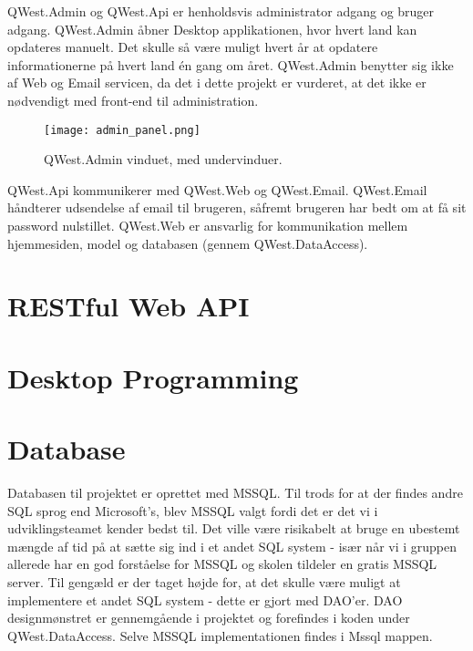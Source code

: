 QWest.Admin og QWest.Api er henholdsvis administrator adgang og bruger adgang. QWest.Admin åbner Desktop applikationen, hvor hvert land kan opdateres manuelt. Det skulle så være muligt hvert år at opdatere informationerne på hvert land én gang om året. QWest.Admin benytter sig ikke af Web og Email servicen, da det i dette projekt er vurderet, at det ikke er nødvendigt med front-end til administration. 

\begin{figure}
    \texttt{[image: admin\_panel.png]}
    \caption{QWest.Admin vinduet, med undervinduer.}
    \label{fig:admin_panel}
\end{figure}

QWest.Api kommunikerer med QWest.Web og QWest.Email. QWest.Email håndterer udsendelse af email til brugeren, såfremt brugeren har bedt om at få sit password nulstillet. QWest.Web er ansvarlig for kommunikation mellem hjemmesiden, model og databasen (gennem QWest.DataAccess).


\section{RESTful Web API}\label{sec:REST}

\section{Desktop Programming}\label{sec:deskProgramming}

\section{Database}\label{sec:database}
Databasen til projektet er oprettet med MSSQL\cite{MSSQL}. Til trods for at der findes andre SQL sprog end Microsoft's, blev MSSQL valgt fordi det er det vi i udviklingsteamet kender bedst til. Det ville være risikabelt at bruge en ubestemt mængde af tid på at sætte sig ind i et andet SQL system - især når vi i gruppen allerede har en god forståelse for MSSQL og skolen tildeler en gratis MSSQL server. Til gengæld er der taget højde for, at det skulle være muligt at implementere et andet SQL system - dette er gjort med DAO'er. DAO\cite{dao} designmønstret er gennemgående i projektet og forefindes i koden under QWest.DataAccess. Selve MSSQL implementationen findes i Mssql mappen. 

